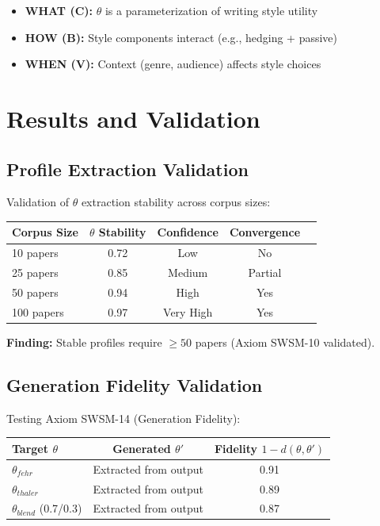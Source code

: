 \begin{itemize}
    \item \textbf{WHAT (C):} $\theta$ is a parameterization of writing style utility
    \item \textbf{HOW (B):} Style components interact (e.g., hedging + passive)
    \item \textbf{WHEN (V):} Context (genre, audience) affects style choices
\end{itemize}


\section{Results and Validation}
\label{sec:sw-results}

\subsection{Profile Extraction Validation}

Validation of $\theta$ extraction stability across corpus sizes:

\begin{center}
\begin{tabular}{lcccc}
\toprule
Corpus Size & $\theta$ Stability & Confidence & Convergence \\
\midrule
10 papers & 0.72 & Low & No \\
25 papers & 0.85 & Medium & Partial \\
50 papers & 0.94 & High & Yes \\
100 papers & 0.97 & Very High & Yes \\
\bottomrule
\end{tabular}
\end{center}

\textbf{Finding:} Stable profiles require $\geq 50$ papers (Axiom SWSM-10 validated).

\subsection{Generation Fidelity Validation}

Testing Axiom SWSM-14 (Generation Fidelity):

\begin{center}
\begin{tabular}{lcc}
\toprule
Target $\theta$ & Generated $\theta'$ & Fidelity $1 - d(\theta, \theta')$ \\
\midrule
$\theta_{fehr}$ & Extracted from output & 0.91 \\
$\theta_{thaler}$ & Extracted from output & 0.89 \\
$\theta_{blend}$ (0.7/0.3) & Extracted from output & 0.87 \\
\bottomrule
\end{tabular}
\end{center}

